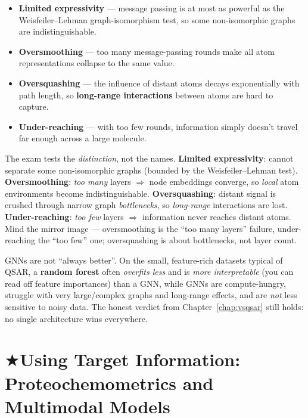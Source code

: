 \documentclass[11pt, oneside]{book}
\makeatletter
\newcommand{\starglyph}{\textcolor{stargold}{\ensuremath{\bigstar}}}
\newcommand{\starsec}[1]{%
  \texorpdfstring{\starglyph\hspace{0.4em}\textcolor{star@frame}{#1}}{#1}}
\makeatother
\begin{document}
\begin{itemize}
  \item \textbf{Limited expressivity} --- message passing is at most as powerful as
        the Weisfeiler--Lehman graph-isomorphism test, so some non-isomorphic
        graphs are indistinguishable.
  \item \textbf{Oversmoothing} --- too many message-passing rounds make all atom
        representations collapse to the same value.
  \item \textbf{Oversquashing} --- the influence of distant atoms decays
        exponentially with path length, so \textbf{long-range interactions} between
        atoms are hard to capture.
  \item \textbf{Under-reaching} --- with too few rounds, information simply doesn't
        travel far enough across a large molecule.
\end{itemize}

\begin{starbox}[title={Exam-critical: tell the four GNN pathologies apart}]
The exam tests the \emph{distinction}, not the names.
\textbf{Limited expressivity}: cannot separate some non-isomorphic graphs (bounded
by the Weisfeiler--Lehman test). \textbf{Oversmoothing}: \emph{too many} layers
$\Rightarrow$ node embeddings converge, so \emph{local} atom environments become
indistinguishable. \textbf{Oversquashing}: distant signal is crushed through narrow
graph \emph{bottlenecks}, so \emph{long-range} interactions are lost.
\textbf{Under-reaching}: \emph{too few} layers $\Rightarrow$ information never
reaches distant atoms. Mind the mirror image --- oversmoothing is the ``too many
layers'' failure, under-reaching the ``too few'' one; oversquashing is about
bottlenecks, not layer count.
\end{starbox}

\begin{notebox}[title={GNN vs.\ Random Forest --- a realistic comparison}]
GNNs are not ``always better''. On the small, feature-rich datasets typical of
QSAR, a \textbf{random forest} often \emph{overfits less} and is \emph{more
interpretable} (you can read off feature importances) than a GNN, while GNNs are
compute-hungry, struggle with very large/complex graphs and long-range effects,
and are \emph{not} less sensitive to noisy data. The honest verdict from
Chapter~\ref{chap:vsqsar} still holds: no single architecture wins everywhere.
\end{notebox}

\section{\starsec{Using Target Information: Proteochemometrics and Multimodal Models}}
\end{document}
